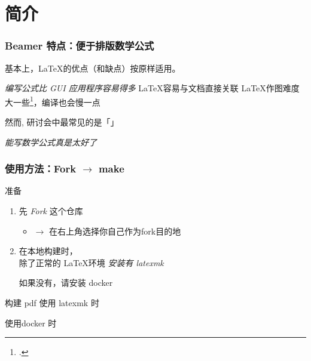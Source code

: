 \section{简介}

\begin{frame}
  \frametitle{Beamer 特点：便于排版数学公式}
  
  基本上，\LaTeX 的优点{\footnotesize （和缺点）}按原样适用。
  \begin{itemize}
    \okitem \emph{编写公式比 GUI 应用程序容易得多}
    \okitem \LaTeX 容易与文档直接关联
    \ngitem \LaTeX 作图难度大一些\footcite{tikz-nakata}，编译也会慢一点
  \end{itemize}

  \begin{block}{然而, }
    研讨会中最常见的是「」
    \begin{itemize}
      \thusitem \emph{能写数学公式真是太好了}
    \end{itemize}
  \end{block}
\end{frame}

\begin{frame}
  \frametitle{使用方法：Fork \(\rightarrow\) make}

  \begin{block}{准备}
    \begin{enumerate}
    \item
      先 \emph{Fork} 这个仓库
      \begin{itemize}
        \item \(\rightarrow\) 在右上角选择你自己作为fork目的地
      \end{itemize}
    \item
      在本地构建时，\\
      除了正常的 \LaTeX 环境 \emph{安装有 latexmk}
      \begin{itemize}
        \butitem 如果没有，请安装 docker
      \end{itemize}
    \end{enumerate}
  \end{block}

  \begin{block}{构建 pdf}
    使用 latexmk 时\ \hbox{}
  \begin{itemize}
    \butitem
    使用docker 时\ \hbox{}
  \end{itemize}
  \end{block}
\end{frame}

